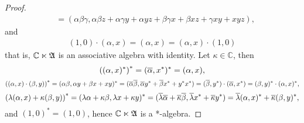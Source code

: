 \begin{proof}
\begin{align*}
                                                               &= (\alpha \beta \gamma, \alpha \beta z + \alpha \gamma y + \alpha yz + \beta \gamma x + \beta x z + \gamma xy + xyz),
    \end{align*}
    and
    \begin{align*}
        (1, 0) \cdot (\alpha,x) = (\alpha, x) = (\alpha, x) \cdot (1,0)
    \end{align*}
    that is, \(\mathbb{C} \ltimes \mathfrak{A}\) is an associative algebra with identity. Let \(\kappa \in \mathbb{C}\), then
    \begin{equation*}
        \left((\alpha, x)^*\right)^* = (\overline{\alpha}, x^*)^* = (\alpha, x),
    \end{equation*}
    \begin{equation*}
        \left((\alpha, x)\cdot(\beta, y)\right)^* = (\alpha \beta, \alpha y + \beta x + xy)^* = (\overline{\alpha}\overline{\beta}, \overline{\alpha}y^* + \overline{\beta}x^* + y^* x^*) = (\overline{\beta}, y^*)\cdot(\overline{\alpha}, x^*) = (\beta, y)^*\cdot(\alpha, x)^*,
    \end{equation*}
    \begin{equation*}
        \left(\lambda (\alpha, x) + \kappa (\beta, y)\right)^* = (\lambda \alpha + \kappa \beta, \lambda x + \kappa y)^* = (\overline{\lambda} \overline{\alpha} + \overline{\kappa}\overline{\beta}, \overline{\lambda}x^* + \overline{\kappa}y^*) = \overline{\lambda}(\alpha, x)^* + \overline{\kappa}(\beta, y)^*,
    \end{equation*}
    and \((1,0)^* = (1,0)\), hence \(\mathbb{C} \ltimes \mathfrak{A}\) is a *-algebra.
\end{proof}

